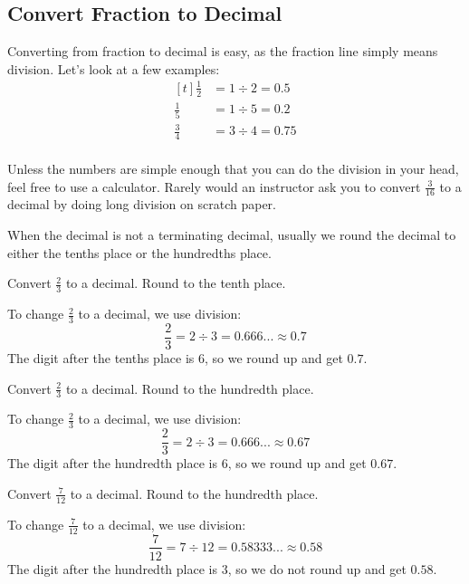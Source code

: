 \subsection{Convert Fraction to Decimal}
Converting from fraction to decimal is easy, as the fraction line simply means division. Let's look at a few examples:
\[
\begin{aligned}[t]
	\frac{1}{2} &= 1\div2 = 0.5 \\
	\frac{1}{5} &= 1\div5 = 0.2 \\
	\frac{3}{4} &= 3\div4 = 0.75 \\
\end{aligned}
\]

Unless the numbers are simple enough that you can do the division in your head, feel free to use a calculator. Rarely would an instructor ask you to convert $\frac{3}{16}$ to a decimal by doing long division on scratch paper.

When the decimal is not a terminating decimal, usually we round the decimal to either the tenths place or the hundredths place.

\begin{myexample}
Convert $\frac{2}{3}$ to a decimal. Round to the tenth place.
\end{myexample}
\begin{solution}
To change $\frac{2}{3}$ to a decimal, we use division:
\[ \frac{2}{3}=2\div3=0.666...\approx 0.7 \]
The digit after the tenths place is $6$, so we round up and get $0.7$.
\end{solution}

\begin{myexample}
Convert $\frac{2}{3}$ to a decimal. Round to the hundredth place.
\end{myexample}
\begin{solution}
To change $\frac{2}{3}$ to a decimal, we use division:
\[ \frac{2}{3}=2\div3=0.666...\approx 0.67 \]
The digit after the hundredth place is $6$, so we round up and get $0.67$.
\end{solution}

\begin{myexample}
Convert $\frac{7}{12}$ to a decimal. Round to the hundredth place.
\end{myexample}
\begin{solution}
To change $\frac{7}{12}$ to a decimal, we use division:
\[ \frac{7}{12}=7\div12=0.58333...\approx 0.58 \]
The digit after the hundredth place is $3$, so we do not round up and get $0.58$.
\end{solution}

